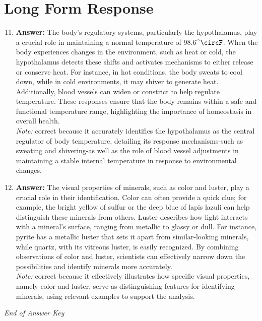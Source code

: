 \documentclass[12pt]{article}
\begin{document}
\section*{Long Form Response}
\begin{enumerate}[label=\arabic*.]
\setcounter{enumi}{10}
\item \textbf{Answer:} The body's regulatory systems, particularly the hypothalamus, play a crucial role in maintaining a normal temperature of 98.6^\ensuremath{\circF}. When the body experiences changes in the environment, such as heat or cold, the hypothalamus detects these shifts and activates mechanisms to either release or conserve heat. For instance, in hot conditions, the body sweats to cool down, while in cold environments, it may shiver to generate heat. Additionally, blood vessels can widen or constrict to help regulate temperature. These responses ensure that the body remains within a safe and functional temperature range, highlighting the importance of homeostasis in overall health.
\\ \textit{Note:} correct because it accurately identifies the hypothalamus as the central regulator of body temperature, detailing its response mechanisms-such as sweating and shivering-as well as the role of blood vessel adjustments in maintaining a stable internal temperature in response to environmental changes.
\item \textbf{Answer:} The visual properties of minerals, such as color and luster, play a crucial role in their identification. Color can often provide a quick clue; for example, the bright yellow of sulfur or the deep blue of lapis lazuli can help distinguish these minerals from others. Luster describes how light interacts with a mineral's surface, ranging from metallic to glassy or dull. For instance, pyrite has a metallic luster that sets it apart from similar-looking minerals, while quartz, with its vitreous luster, is easily recognized. By combining observations of color and luster, scientists can effectively narrow down the possibilities and identify minerals more accurately.
\\ \textit{Note:} correct because it effectively illustrates how specific visual properties, namely color and luster, serve as distinguishing features for identifying minerals, using relevant examples to support the analysis.
\end{enumerate}

\vfill
\noindent\textit{End of Answer Key}
\end{document}
